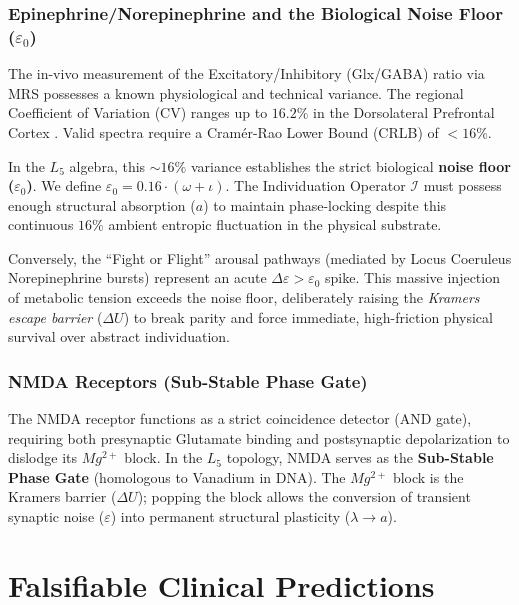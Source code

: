 \subsubsection{Epinephrine/Norepinephrine and the Biological Noise Floor (\texorpdfstring{$\varepsilon_0$}{\varepsilon_0})}
The in-vivo measurement of the Excitatory/Inhibitory (Glx/GABA) ratio via MRS possesses a known physiological and technical variance. The regional Coefficient of Variation (CV) ranges up to $16.2\%$ in the Dorsolateral Prefrontal Cortex \cite{mrs_variance}. Valid spectra require a Cramér-Rao Lower Bound (CRLB) of $<16\%$.

In the $L_5$ algebra, this $\sim 16\%$ variance establishes the strict biological \textbf{noise floor ($\varepsilon_0$)}. We define $\varepsilon_0 = 0.16 \cdot (\omega+\iota)$. The Individuation Operator $\mathcal{I}$ must possess enough structural absorption ($a$) to maintain phase-locking despite this continuous $16\%$ ambient entropic fluctuation in the physical substrate. 

Conversely, the ``Fight or Flight'' arousal pathways (mediated by Locus Coeruleus Norepinephrine bursts) represent an acute $\Delta \varepsilon > \varepsilon_0$ spike. This massive injection of metabolic tension exceeds the noise floor, deliberately raising the \emph{Kramers escape barrier} ($\Delta U$) to break parity and force immediate, high-friction physical survival over abstract individuation.

\subsubsection{NMDA Receptors (Sub-Stable Phase Gate)}
The NMDA receptor functions as a strict coincidence detector (AND gate), requiring both presynaptic Glutamate binding and postsynaptic depolarization to dislodge its $Mg^{2+}$ block. In the $L_5$ topology, NMDA serves as the \textbf{Sub-Stable Phase Gate} (homologous to Vanadium in DNA). The $Mg^{2+}$ block is the Kramers barrier ($\Delta U$); popping the block allows the conversion of transient synaptic noise ($\varepsilon$) into permanent structural plasticity ($\lambda \to a$).

\section{Falsifiable Clinical Predictions}

